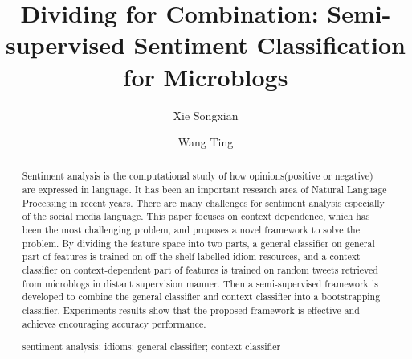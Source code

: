 \documentclass{llncs}
\newcommand{\keywords}[1]{\par\addvspace\baselineskip
\noindent\keywordname\enspace\ignorespaces#1}
\begin{document}
\mainmatter  %

\title{Dividing for Combination: Semi-supervised Sentiment Classification for Microblogs}
%
\author{Xie Songxian%
\and Wang Ting}
%

\maketitle

\begin{abstract}
Sentiment analysis is the computational study of how opinions(positive or negative) are expressed in language. It has been an important research area of Natural Language Processing in recent years.
There are many challenges for sentiment analysis especially of the social media language. 
This paper focuses on context dependence, which has been the most challenging problem, and proposes a novel framework to solve the problem.
By dividing the feature space into two parts, a general 
classifier on general part of features is trained on off-the-shelf labelled idiom resources, 
and a context classifier on context-dependent part of features is trained on random tweets retrieved from microblogs in distant supervision manner. 
Then a semi-supervised framework is developed to combine the general classifier and context classifier into a bootstrapping classifier. 
Experiments results show that the proposed framework is effective and achieves encouraging accuracy performance. 
\keywords{sentiment analysis; idioms; general classifier; context classifier}
\end{abstract}
\end{document}
